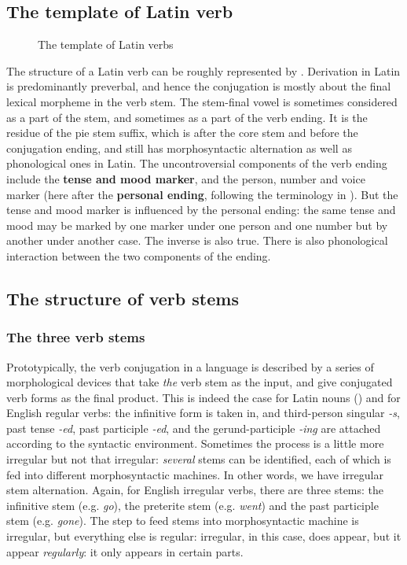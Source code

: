 \documentclass{article}
\newcommand*{\citesec}[1]{\S~{#1}}
\newcommand*{\concept}[1]{\textbf{#1}}
\newcommand*{\corpus}[1]{\emph{#1}}
\begin{document}
\subsection{The template of Latin verb}\label{sec:verb-template}

\begin{figure}
    \centering
    
    \caption{The template of Latin verbs}
    \label{fig:latin-verb}
\end{figure}

The structure of a Latin verb can be roughly represented by .
Derivation in Latin is predominantly preverbal,
and hence the conjugation is mostly about the final lexical morpheme in the verb stem.
The stem-final vowel is sometimes considered as a part of the stem,
and sometimes as a part of the verb ending.
It is the residue of the \ac{pie} stem suffix, which is after the core stem and before the conjugation ending,
and still has morphosyntactic alternation as well as phonological ones in Latin. %
The uncontroversial components of the verb ending include 
the \concept{tense and mood marker},
and the person, number and voice marker 
(here after the \concept{personal ending}, 
following the terminology in \citet[\citesec{165}]{allen1903allen}).
But the tense and mood marker is influenced by the personal ending:
the same tense and mood may be marked by one marker under one person and one number
but by another under another case.
The inverse is also true.
There is also phonological interaction between the two components of the ending.

\subsection{The structure of verb stems}

\subsubsection{The three verb stems}\label{sec:three-latin-stem}

Prototypically, the verb conjugation in a language is described by 
a series of morphological devices that take \emph{the} verb stem as the input,
and give conjugated verb forms as the final product.
This is indeed the case for Latin nouns ()
and for English regular verbs:
the infinitive form is taken in,
and third-person singular \corpus{-s}, past tense \corpus{-ed}, 
past participle \corpus{-ed}, and the gerund-participle \corpus{-ing}
are attached according to the syntactic environment.
Sometimes the process is a little more irregular but not that irregular:
\emph{several} stems can be identified, each of which is fed into different morphosyntactic machines.
In other words, we have irregular stem alternation.
Again, for English irregular verbs,
there are three stems: the infinitive stem (e.g. \corpus{go}), 
the preterite stem (e.g. \corpus{went})
and the past participle stem (e.g. \corpus{gone}).
The step to feed stems into morphosyntactic machine is irregular,
but everything else is regular:
irregular, in this case, does appear, but it appear \emph{regularly}:
it only appears in certain parts.
\end{document}
